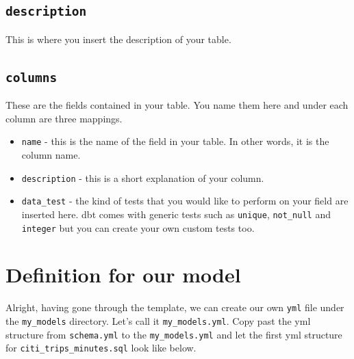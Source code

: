 \documentclass[
]{book}
\begin{document}
\hypertarget{description}{%
\subsection{\texorpdfstring{\texttt{description}}{description}}\label{description}}

This is where you insert the description of your table.

\hypertarget{columns}{%
\subsection{\texorpdfstring{\texttt{columns}}{columns}}\label{columns}}

These are the fields contained in your table. You name them here and under each column are three mappings.

\begin{itemize}
\item
  \texttt{name} - this is the name of the field in your table. In other words, it is the column name.
\item
  \texttt{description} - this is a short explanation of your column.
\item
  \texttt{data\_test} - the kind of tests that you would like to perform on your field are inserted here. dbt comes with generic tests such as \texttt{unique}, \texttt{not\_null} and \texttt{integer} but you can create your own custom tests too.
\end{itemize}

\hypertarget{definition-for-our-model}{%
\section{Definition for our model}\label{definition-for-our-model}}

Alright, having gone through the template, we can create our own \texttt{yml} file under the \texttt{my\_models} directory. Let's call it \texttt{my\_models.yml}. Copy past the yml structure from \texttt{schema.yml} to the \texttt{my\_models.yml} and let the first yml structure for \texttt{citi\_trips\_minutes.sql} look like below.
\end{document}
